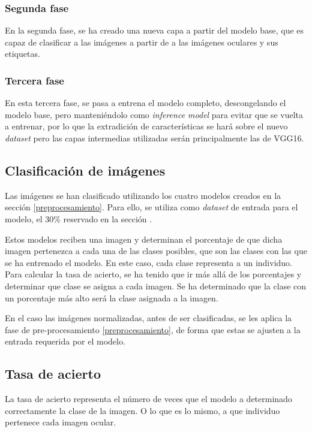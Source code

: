 \subsubsection{Segunda fase}

En la segunda fase, se ha creado una nueva capa a partir del modelo base, que es capaz de clasificar a las imágenes a partir de a las imágenes oculares y sus etiquetas. 

\subsubsection{Tercera fase}

En esta tercera fase, se pasa a entrena el modelo completo, descongelando el modelo base, pero manteniéndolo como \textit{inference model} para evitar que se vuelta a entrenar, por lo que la extradición de características se hará sobre el nuevo \textit{dataset} pero las capas intermedias utilizadas serán principalmente las de VGG16.

\subsection{Clasificación de imágenes}

Las imágenes se han clasificado utilizando los cuatro modelos creados en la sección \ref{preprocesamiento}. Para ello, se utiliza como \textit{dataset} de entrada para el modelo, el 30\% reservado en la sección .

Estos modelos reciben una imagen y determinan el porcentaje de que dicha imagen pertenezca a cada una de las clases posibles, que son las clases con las que se ha entrenado el modelo. En este caso, cada clase representa a un individuo. Para calcular la tasa de acierto, se ha tenido que ir más allá de los porcentajes y determinar que clase se asigna a cada imagen. Se ha determinado que la clase con un porcentaje más alto será la clase asignada a la imagen.

En el caso las imágenes normalizadas, antes de ser clasificadas, se les aplica la fase de pre-procesamiento \ref{preprocesamiento}, de forma que estas se ajusten a la entrada requerida por el modelo.

\subsection{Tasa de acierto} 

La tasa de acierto representa el número de veces que el modelo a determinado correctamente la clase de la imagen. O lo que es lo mismo, a que individuo pertenece cada imagen ocular.

